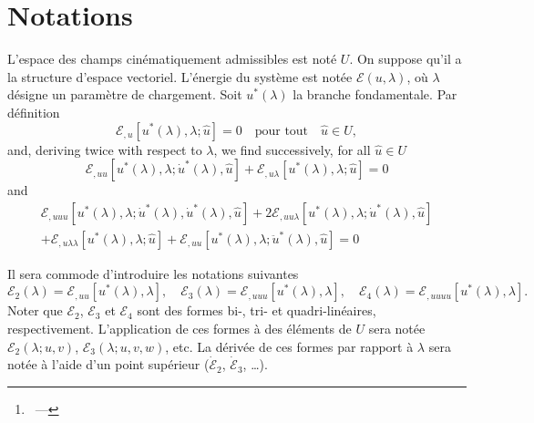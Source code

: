 \documentclass[12pt, final]{scrartcl}
\theoremstyle{definition}
\newcommand{\E}{\mathcal E}
\begin{document}
\title{\sbtitle}
\author{\sbauthor\thanks{\sbaddress~--- \sbemail}}
\maketitle

\section{Notations}

L'espace des champs cinématiquement admissibles est noté $U$. On suppose qu'il
a la structure d'espace vectoriel. L'énergie du système est notée $\E(u, \lambda)$,
où $\lambda$ désigne un paramètre de chargement. Soit $u^{\ast}(\lambda)$ la branche
fondamentale. Par définition
\begin{equation}
  \E_{,u}[u^{\ast}(\lambda), \lambda; \hat{u}]=0 \quad \text{pour tout} \quad \hat{u}\in U,
\end{equation}
and, deriving twice with respect to $\lambda$, we find successively, for all $\hat{u} \in U$
\begin{equation}
  \label{eq:20220901143843}
  \E_{,uu}[u^\ast(\lambda), \lambda; \dot{u}^\ast(\lambda), \hat{u}] + \E_{,u\lambda}[u^\ast(\lambda), \lambda; \hat{u}] = 0
\end{equation}
and
\begin{multline}
  \label{eq:20220901143902}
  \E_{,uuu}[u^\ast(\lambda), \lambda; \dot{u}^\ast(\lambda), \dot{u}^\ast(\lambda), \hat{u}] + 2\E_{,uu\lambda}[u^\ast(\lambda), \lambda; \dot{u}^\ast(\lambda), \hat{u}]\\
  + \E_{,u\lambda\lambda}[u^\ast(\lambda), \lambda; \hat{u}] + \E_{,uu}[u^\ast(\lambda), \lambda; \ddot{u}^\ast(\lambda), \hat{u}] = 0
\end{multline}





Il sera commode d'introduire les notations suivantes
\begin{equation}
  \E_2(\lambda) = \E_{,uu}[u^{\ast}(\lambda), \lambda], \quad \E_3(\lambda) = \E_{,uuu}[u^{\ast}(\lambda), \lambda], \quad \E_4(\lambda) = \E_{,uuuu} [u^{\ast}(\lambda), \lambda].
\end{equation}
Noter que $\E_2$, $\E_3$ et $\E_4$ sont des formes bi-, tri- et
quadri-linéaires, respectivement. L'application de ces formes à des éléments de
$U$ sera notée $\E_2(\lambda; u, v)$, $\E_3(\lambda; u, v, w)$, etc. La dérivée de ces
formes par rapport à $\lambda$ sera notée à l'aide d'un point supérieur
($\dot{\E}_2$, $\dot{\E}_3$, \dots).
\end{document}
